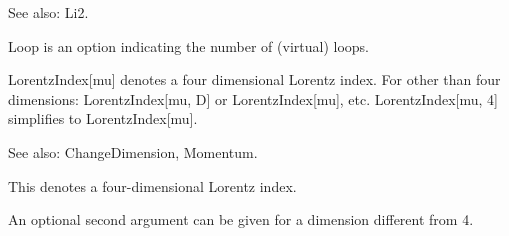 See also: Li2.












Loop is an option indicating the number of (virtual) loops.



LorentzIndex[mu] denotes a four dimensional Lorentz index. For other than four dimensions: LorentzIndex[mu, D] or LorentzIndex[mu], etc.
  LorentzIndex[mu, 4] simplifies to LorentzIndex[mu].

See also:  ChangeDimension, Momentum.


This denotes a four-dimensional Lorentz index.



An optional second argument can be given for a dimension different from 4.




\dispSFoutmath{
\alpha 
}


\dispSFoutmath{
\alpha 
}


